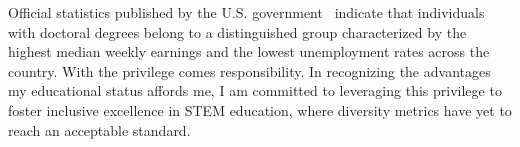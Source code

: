 Official statistics published by the U.S. government~\cite{EducationPaysBureau} indicate that individuals with doctoral degrees belong to a distinguished group characterized by the highest median weekly earnings and the lowest unemployment rates across the country. With the privilege comes responsibility. In recognizing the advantages my educational status affords me, I am committed to leveraging this privilege to foster inclusive excellence in STEM education, where diversity metrics have yet to reach an acceptable standard.